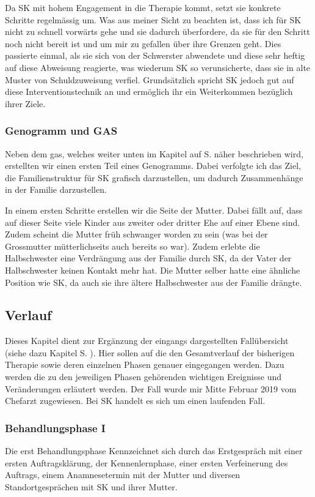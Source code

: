 Da SK mit hohem Engagement in die Therapie kommt, setzt sie konkrete Schritte regelmässig um. Was aus meiner Sicht zu beachten ist, dass ich für SK nicht zu schnell vorwärts gehe und sie dadurch überfordere, da sie für den Schritt noch nicht bereit ist und um mir zu gefallen über ihre Grenzen geht. Dies passierte einmal, als sie sich von der Schwerster abwendete und diese sehr heftig auf diese Abweisung reagierte, was wiederum SK so verunsicherte, dass sie in alte Muster von Schuldzuweisung verfiel. Grundsätzlich spricht SK jedoch gut auf diese Interventionstechnik an und ermöglich ihr ein Weiterkommen bezüglich ihrer Ziele.

\subsubsection{Genogramm und GAS}
Neben dem \ac{gas}, welches weiter unten im Kapitel  auf S. \pageref{lbEvaluationsverfahren} näher beschrieben wird, erstellten wir einen ersten Teil eines Genogramms. Dabei verfolgte ich das Ziel, die Familienstruktur für SK grafisch darzustellen, um dadurch Zusammenhänge in der Familie darzustellen. 

In einem ersten Schritte erstellen wir die Seite der Mutter. Dabei fällt auf, dass auf dieser Seite viele Kinder aus zweiter oder dritter Ehe auf einer Ebene sind. Zudem scheint die Mutter früh schwanger worden zu sein (was bei der Grossmutter mütterlichseits auch bereits so war). Zudem erlebte die Halbschwester eine Verdrängung aus der Familie durch SK, da der Vater der Halbschwester keinen Kontakt mehr hat. Die Mutter selber hatte eine ähnliche Position wie SK, da auch sie ihre ältere Halbschwester aus der Familie drängte.

\subsection{Verlauf}\label{Verlauf} 
Dieses Kapitel dient zur Ergänzung der eingangs dargestellten Fallübersicht (siehe dazu Kapitel  S. \pageref{lbFallübersicht}). Hier sollen auf die den Gesamtverlauf der bisherigen Therapie sowie deren einzelnen Phasen genauer eingegangen werden. Dazu werden die zu den jeweiligen Phasen gehörenden wichtigen Ereignisse und Veränderungen erläutert werden. Der Fall wurde mir Mitte Februar 2019 vom Chefarzt zugewiesen. Bei SK handelt es sich um einen laufenden Fall. 
\subsubsection{Behandlungsphase I}
Die erst Behandlungsphase Kennzeichnet sich durch das Erstgespräch mit einer ersten Auftragsklärung, der Kennenlernphase, einer ersten Verfeinerung des Auftrags, einem Anamnesetermin mit der Mutter und diversen Standortgesprächen mit SK und ihrer Mutter. 

